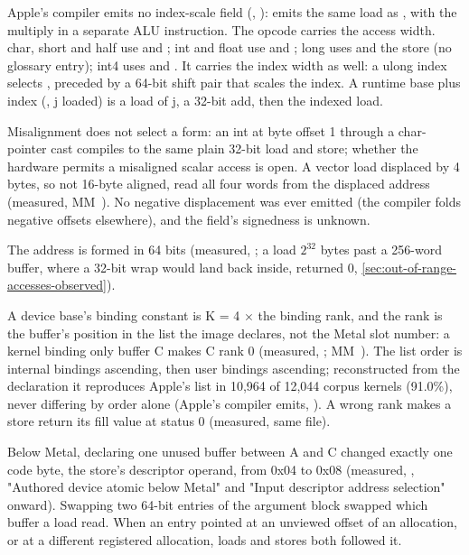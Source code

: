 Apple's compiler emits no index-scale field (,
):  emits the same load
as , with the multiply in a separate ALU instruction. The opcode carries the access width. char, short and half
use  and ; int and float use  and ; long uses  and the store 
(no glossary entry); int4 uses  and . It carries the index width as well: a ulong index selects
, preceded by a 64-bit shift pair that scales the index. A runtime base plus index (, j loaded)
is a load of j, a 32-bit add, then the indexed load.

Misalignment does not select a form: an int at byte offset 1 through a char-pointer cast compiles to the same plain 32-bit
load and store; whether the hardware permits a misaligned scalar access is open. A vector load displaced by 4 bytes, so not
16-byte aligned, read all four words from the displaced address (measured, MM~). No negative displacement was
ever emitted (the compiler folds negative offsets elsewhere), and the field's signedness is unknown.

The address is formed in 64 bits (measured, ; a load $2^{32}$ bytes past a 256-word
buffer, where a 32-bit wrap would land back inside, returned 0, \cref{sec:out-of-range-accesses-observed}).

A device base's binding constant is K = 4 $\times$ the binding rank, and the rank is the buffer's
position in the list the image declares, not the Metal slot number: a kernel binding only buffer C makes C rank 0
(measured, ; MM~). The list order is internal bindings ascending, then user bindings ascending;
reconstructed from the declaration it reproduces Apple's list in 10,964 of 12,044 corpus kernels (91.0\%), never
differing by order alone (Apple's compiler emits, ). A wrong rank makes a store return its fill
value at status 0 (measured, same file).

Below Metal, declaring one unused buffer between A and C changed exactly one code byte, the store's descriptor operand,
from 0x04 to 0x08 (measured, , "Authored device atomic below Metal" and "Input
descriptor address selection" onward). Swapping two 64-bit
entries of the argument block swapped which buffer a load read. When an entry pointed at an unviewed offset of an
allocation, or at a different registered allocation, loads and stores both followed it.

